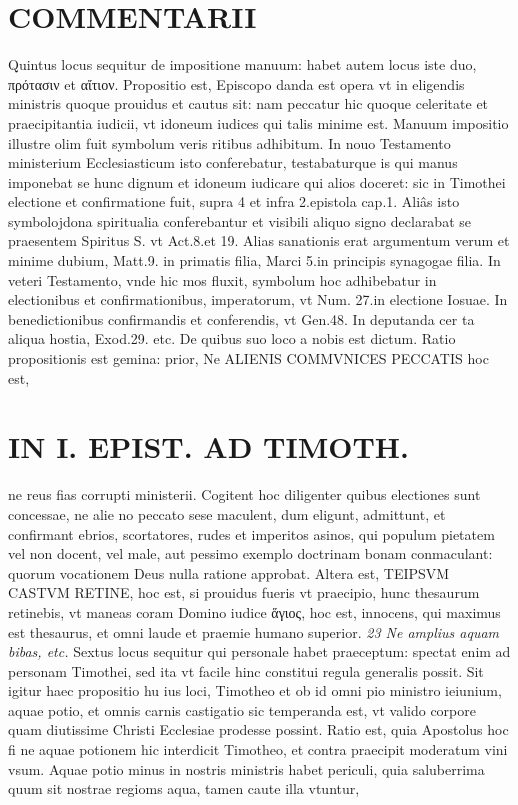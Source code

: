 \documentclass{article}
\begin{document}
\begin{pages}
\section*{COMMENTARII }
\marginpar{[ p.138 ]}\pstart Quintus locus sequitur de impositione manuum: habet autem locus iste duo, πρότασιν et αἴτιον. Propositio est, Episcopo danda est opera vt in eligendis ministris quoque prouidus et cautus sit: nam peccatur hic quoque celeritate et praecipitantia iudicii, vt idoneum iudices qui talis minime est. Manuum impositio illustre olim fuit symbolum veris ritibus adhibitum. In nouo Testamento ministerium Ecclesiasticum isto conferebatur, testabaturque is qui manus imponebat se hunc dignum et idoneum iudicare qui alios doceret: sic in Timothei electione et confirmatione fuit, supra 4 et infra 2.epistola cap.1. Aliâs isto symbolojdona spiritualia conferebantur et visibili aliquo signo declarabat se praesentem Spiritus S. vt Act.8.et 19. Alias sanationis erat argumentum verum et minime dubium, Matt.9. in primatis filia, Marci 5.in principis synagogae filia. In veteri Testamento, vnde hic mos fluxit, symbolum hoc adhibebatur in electionibus et confirmationibus, imperatorum, vt Num. 27.in electione Iosuae. In benedictionibus confirmandis et conferendis, vt Gen.48. In deputanda cer ta aliqua hostia, Exod.29. etc. De quibus suo loco a nobis est dictum.  \pend\pstart Ratio propositionis est gemina: prior, Ne ALIENIS COMMVNICES PECCATIS hoc est,  \pend
\section*{IN I. EPIST. AD TIMOTH. }
\marginpar{[ p.139 ]}\pstart ne reus fias corrupti ministerii. Cogitent hoc diligenter quibus electiones sunt concessae, ne alie no peccato sese maculent, dum eligunt, admittunt, et confirmant ebrios, scortatores, rudes et imperitos asinos, qui populum pietatem vel non docent, vel male, aut pessimo exemplo doctrinam bonam conmaculant: quorum vocationem Deus nulla ratione approbat.  \pend\pstart Altera est, TEIPSVM CASTVM RETINE, hoc est, si prouidus fueris vt praecipio, hunc thesaurum retinebis, vt maneas coram Domino iudice ἅγιος, hoc est, innocens, qui maximus est thesaurus, et omni laude et praemie humano superior.  \pend
\textit{23 Ne amplius aquam bibas, etc. }\pstart Sextus locus sequitur qui personale habet praeceptum: spectat enim ad personam Timothei, sed ita vt facile hinc constitui regula generalis possit. Sit igitur haec propositio hu ius loci, Timotheo et ob id omni pio ministro ieiunium, aquae potio, et omnis carnis castigatio sic temperanda est, vt valido corpore quam diutissime Christi Ecclesiae prodesse possint. Ratio est, quia Apostolus hoc fi ne aquae potionem hic interdicit Timotheo, et contra praecipit moderatum vini vsum. Aquae potio minus in nostris ministris habet periculi, quia saluberrima quum sit nostrae regioms aqua, tamen caute illa vtuntur,  \pend

\end{pages}
\end{document}
